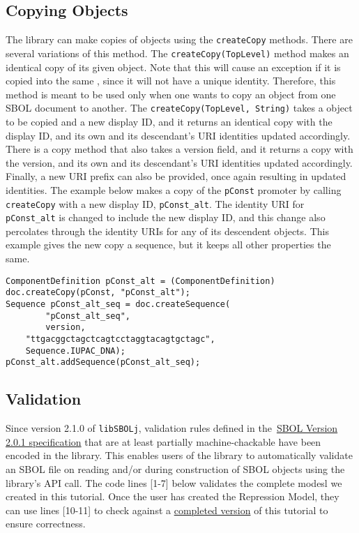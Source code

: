 \subsection*{Copying Objects}
The library can make copies of  objects using the \lstinline+createCopy+ methods.  There are several variations of this method. The \lstinline+createCopy(TopLevel)+ method makes an identical copy of its given  object. Note that this will cause an exception if it is copied into the same , since it will not have a unique identity. Therefore, this method is meant to be used only when one wants to copy an object from one SBOL document to another. The \lstinline+createCopy(TopLevel, String)+ takes a  object to be copied and a new display ID, and it returns an identical copy with the display ID, and its own and its descendant's URI identities updated accordingly. There is a copy method that also takes a version field, and it returns a copy with the version, and its own and its descendant's URI identities updated accordingly.  Finally, a new URI prefix can also be provided, once again resulting in updated identities. The example below makes a copy of the
\lstinline+pConst+ promoter by calling \lstinline+createCopy+ with a new display ID, \lstinline+pConst_alt+. The identity URI for \lstinline+pConst_alt+ is changed to include the new display ID, and this change also percolates through the identity URIs for any of its descendent objects.  This example gives the new copy a sequence, but it keeps all other properties the same. 

\vspace{\abovedisplayskip}
\begin{minipage}{0.95\textwidth} 
\begin{lstlisting}
ComponentDefinition pConst_alt = (ComponentDefinition) doc.createCopy(pConst, "pConst_alt");
Sequence pConst_alt_seq = doc.createSequence(
        "pConst_alt_seq", 
        version, 
	"ttgacggctagctcagtcctaggtacagtgctagc",
	Sequence.IUPAC_DNA); 
pConst_alt.addSequence(pConst_alt_seq);
\end{lstlisting}
\end{minipage}

\subsection*{Validation}
Since version 2.1.0 of {\tt libSBOLj}, validation rules defined in
the~\href{http://sbolstandard.org/downloads/specification-data-model-2-0/}{SBOL
  Version 2.0.1 specification} that are at least partially
machine-chackable have been encoded in the library. This enables users
of the library to automatically validate an SBOL file on reading
and/or during construction of SBOL objects using the library's API
call. The code lines [1-7] below validates the complete modesl we created in this
tutorial. Once the user has created the Repression Model, they can use lines [10-11] to check against a \href{https://github.com/SynBioDex/libSBOLj/blob/master/core2/src/test/resources/SBOL2/RepressionModel.rdf}{completed version} of this tutorial to ensure correctness. 


